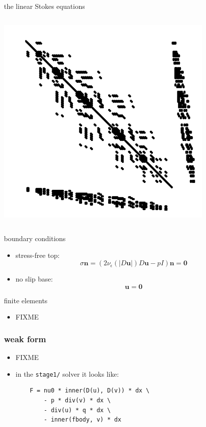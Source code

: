 \documentclass[10pt,hyperref,dvipsnames]{beamer}
\newcommand{\bn}{\mathbf{n}}
\newcommand{\bu}{\mathbf{u}}
\newcommand{\bzero}{\mathbf{0}}
\newcommand{\eps}{\epsilon}
\begin{document}
\begin{frame}{the linear Stokes equations}
\begin{columns}
\begin{column}{0.4\textwidth}
\vspace{10mm}
\hfill \includegraphics[width=0.8\textwidth]{figs/Kstokes.pdf}
\end{column}

\end{columns}
\end{frame}


\begin{frame}{boundary conditions}

\begin{itemize}
\item stress-free top:
\begin{equation*}
\sigma \bn = \left(2 \nu_\eps(|D\bu|) D\bu - pI\right) \bn = \bzero
\end{equation*}
\item no slip base:
\begin{equation*}
\bu = \bzero
\end{equation*}
\end{itemize}
\end{frame}


\begin{frame}{finite elements}

\begin{itemize}
\item FIXME
\end{itemize}
\end{frame}


\begin{frame}[fragile]
\frametitle{weak form}

\begin{itemize}
\item FIXME
\item in the \texttt{stage1/} solver it looks like:
\begin{Verbatim}
    F = nu0 * inner(D(u), D(v)) * dx \
        - p * div(v) * dx \
        - div(u) * q * dx \
        - inner(fbody, v) * dx
\end{Verbatim}
\end{itemize}
\end{frame}
\end{document}

